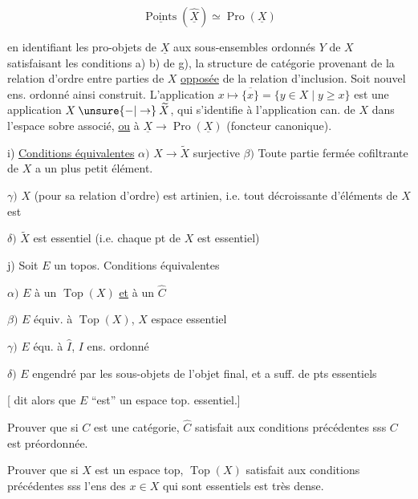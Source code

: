 \[
\underline{\operatorname{Points}}(\widehat{\underline X})\simeq\operatorname{Pro}(\underline X)
\]

en identifiant les pro-objets de $\underline X$  aux sous-ensembles
ordonnés $Y$ de $X$ satisfaisant les conditions a) b) de g),
 la structure de catégorie provenant de la relation
d'ordre entre parties de $X$ \uline{opposée} de la relation d'inclusion.
Soit  nouvel ens. ordonné ainsi construit. L'application
$x\longmapsto\overline{\{x\}}=\{y\in X\mid y\geq x\}$ est une application $X\mathbin{\unsure{-|\to}}\widetilde X$, qui
s'identifie à l'application can. de $X$ dans l'espace sobre
associé, \uline{ou} à $\underline X\longrightarrow\operatorname{Pro}(\underline X)$ (foncteur canonique).

i) \uline{Conditions équivalentes} $\alpha)$ $X\longrightarrow\widetilde X$ surjective
$\beta)$ Toute partie fermée cofiltrante de $X$ a un plus petit élément.

$\gamma)$  $X$ (pour sa relation d'ordre) est artinien, i.e. tout
 décroissante d'éléments de $X$ est 

$\delta)$ $\widetilde X$ est essentiel (i.e. chaque pt de $X$ est essentiel)


j) Soit $E$ un topos. Conditions équivalentes

$\alpha)$ $E$  à un $\operatorname{Top}(X)$ \uline{et} à un $\widehat C$

$\beta)$ $E$ équiv. à $\operatorname{Top}(X)$, $X$ espace essentiel

$\gamma)$ $E$ équ. à $\widehat I$, $I$ ens. ordonné

$\delta)$ $E$ engendré par les sous-objets de l'objet final, et
a suff. de pts essentiels

[ dit alors que $E$ ``est'' un espace top. essentiel.]

Prouver que si $C$ est une catégorie, $\widehat C$ satisfait aux conditions
précédentes sss $C$ est préordonnée.

Prouver que si $X$ est un espace top, $\operatorname{Top}(X)$ satisfait aux
conditions précédentes sss l'ens des $x\in X$ qui sont
essentiels est très dense.

